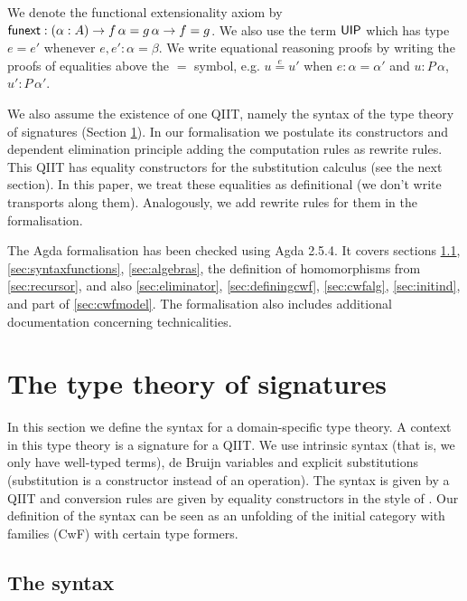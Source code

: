 \documentclass[acmsmall,review,anonymous]{acmart}\settopmatter{printfolios=true,printccs=false,printacmref=false}
\begin{document}
We denote the functional extensionality axiom by $\mathsf{funext} : (\alpha :
A)\rightarrow f\,\alpha = g\,\alpha \rightarrow f = g$. We also use the term $\mathsf{UIP}$
which has type $e = e'$ whenever $e,e':\alpha=\beta$. We write
equational reasoning proofs by writing the proofs of equalities above
the $=$ symbol, e.g. $u \overset{e}{=} u'$ when $e:\alpha = \alpha'$
and $u:P\,\alpha$, $u':P\,\alpha'$.

We also assume the existence of one QIIT, namely the syntax of the
type theory of signatures (Section \ref{sec:signatures}). In our
formalisation we postulate its constructors and dependent elimination
principle adding the computation rules as rewrite rules. This QIIT has
equality constructors for the substitution calculus (see the next
section). In this paper, we treat these equalities as definitional (we
don't write transports along them). Analogously, we add rewrite rules
for them in the formalisation.

The Agda formalisation has been checked using Agda 2.5.4. It covers
sections \ref{sec:syntax}, \ref{sec:syntaxfunctions},
\ref{sec:algebras}, the definition of homomorphisms from
\ref{sec:recursor}, and also \ref{sec:eliminator},
\ref{sec:definingcwf}, \ref{sec:cwfalg}, \ref{sec:initind}, and part
of \ref{sec:cwfmodel}. The formalisation also includes additional
documentation concerning technicalities.



\section{The type theory of signatures}
\label{sec:signatures}

In this section we define the syntax for a domain-specific type
theory. A context in this type theory is a signature for a QIIT. We
use intrinsic syntax (that is, we only have well-typed terms), de
Bruijn variables and explicit substitutions (substitution is a
constructor instead of an operation). The syntax is given by a QIIT
and conversion rules are given by equality constructors in the style
of \cite{ttintt}. Our definition of the syntax can be seen as an
unfolding of the initial category with families (CwF)
\cite{Dybjer96internaltype} with certain type formers.

\subsection{The syntax}
\label{sec:syntax}
\end{document}
